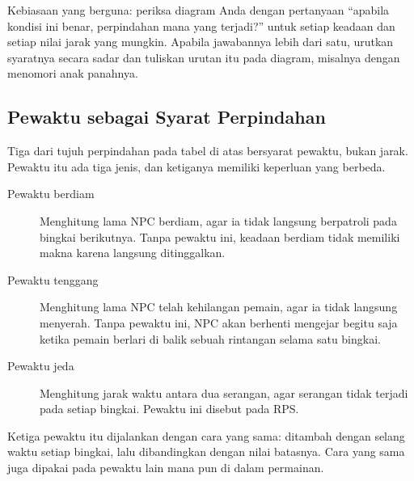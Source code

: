 \begin{tipsbox}
Kebiasaan yang berguna: periksa diagram Anda dengan pertanyaan ``apabila
kondisi ini benar, perpindahan mana yang terjadi?'' untuk setiap keadaan dan
setiap nilai jarak yang mungkin. Apabila jawabannya lebih dari satu, urutkan
syaratnya secara sadar dan tuliskan urutan itu pada diagram, misalnya dengan
menomori anak panahnya.
\end{tipsbox}

\subsection{Pewaktu sebagai Syarat Perpindahan}

Tiga dari tujuh perpindahan pada tabel di atas bersyarat
pewaktu, bukan jarak. Pewaktu itu ada tiga jenis, dan ketiganya memiliki
keperluan yang berbeda.

\begin{description}
  \item[Pewaktu berdiam] Menghitung lama NPC berdiam, agar ia tidak langsung
        berpatroli pada bingkai berikutnya. Tanpa pewaktu ini, keadaan berdiam
        tidak memiliki makna karena langsung ditinggalkan.
  \item[Pewaktu tenggang] Menghitung lama NPC telah kehilangan pemain, agar ia
        tidak langsung menyerah. Tanpa pewaktu ini, NPC akan berhenti mengejar
        begitu saja ketika pemain berlari di balik sebuah rintangan selama satu
        bingkai.
  \item[Pewaktu jeda] Menghitung jarak waktu antara dua serangan, agar serangan
        tidak terjadi pada setiap bingkai. Pewaktu ini disebut
         pada RPS.
\end{description}

Ketiga pewaktu itu dijalankan dengan cara yang sama: ditambah dengan selang
waktu setiap bingkai, lalu dibandingkan dengan nilai batasnya. Cara yang sama
juga dipakai pada pewaktu lain mana pun di dalam permainan.
